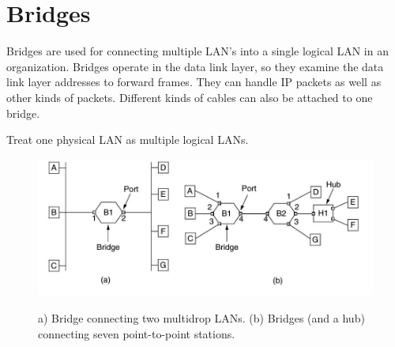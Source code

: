 \documentclass[a4paper,oneside]{book}
\begin{document}
\section{Bridges}
\begin{definition}[Bridges]
Bridges are used for connecting multiple LAN's  into a single logical LAN in an organization. Bridges operate in the data link layer, so they examine the data link layer addresses to forward frames. They can handle IP packets as well as other kinds of packets. Different kinds of cables can also be attached to one bridge. 
\end{definition}
\begin{definition}
Treat one physical LAN as multiple logical LANs.
\end{definition}
\begin{figure}[H]
\caption{a) Bridge connecting two multidrop LANs. (b) Bridges (and a hub) connecting seven point-to-point stations.}
\includegraphics[scale=0.6]{Images/bridges}
\label{fig:cn_bridges}
\end{figure}
\end{document}
